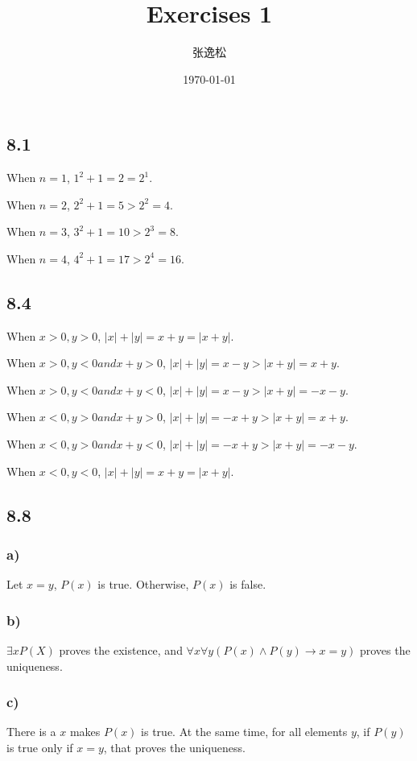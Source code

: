 \documentclass[10pt]{ctexart}
\title{Exercises 1}
\author{张逸松}
\date{\today}
\begin{document}
    \maketitle
    \subsection*{8.1}
    When $n = 1$, $1^2 + 1 = 2 = 2^1$. \par
    When $n = 2$, $2^2 + 1 = 5 > 2^2 = 4$. \par
    When $n = 3$, $3^2 + 1 = 10 > 2^3 = 8$. \par
    When $n = 4$, $4^2 + 1 = 17 > 2^4 = 16$.

    \subsection*{8.4}
    When $x > 0, y > 0$, $|x| + |y| = x + y = |x + y|$. \par
    When $x > 0, y < 0 and x + y > 0$, $|x| + |y| = x - y > |x + y| = x + y $. \par
    When $x > 0, y < 0 and x + y < 0$, $|x| + |y| = x - y > |x + y| = -x - y $. \par
    When $x < 0, y > 0 and x + y > 0$, $|x| + |y| = -x + y > |x + y| = x + y $. \par
    When $x < 0, y > 0 and x + y < 0$, $|x| + |y| = -x + y > |x + y| = -x - y $. \par
    When $x < 0, y < 0$, $|x| + |y| = x + y = |x + y|$.

    \subsection*{8.8}
    \subsubsection*{a)}
    Let $x = y$, $P(x)$ is true. Otherwise, $P(x)$ is false.

    \subsubsection*{b)}
    $\exists xP(X)$ proves the existence, and $\forall x \forall y (P(x) \wedge P(y) \rightarrow x = y)$ proves the uniqueness.

    \subsubsection*{c)}
    There is a $x$ makes $P(x)$ is true. At the same time, for all elements $y$, if $P(y)$ is true only if $x = y$, that proves the uniqueness.
\end{document}
